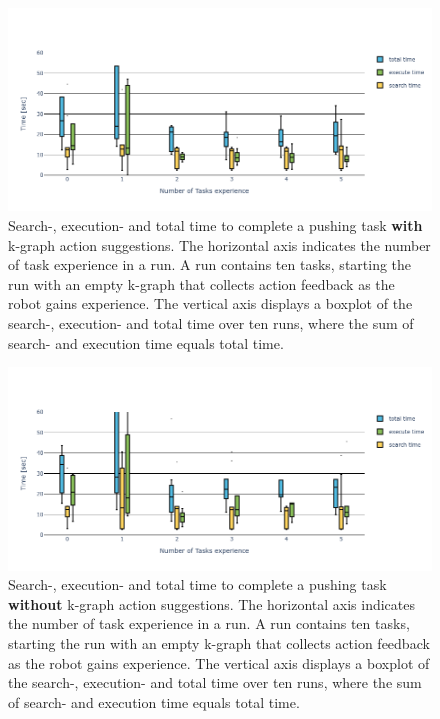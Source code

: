 \begin{figure}[H]
    \centering
    \includegraphics[width=\textwidth]{figures/results/random_push_time_k-graph}
    \caption{Search-, execution- and total time to complete a pushing task \textbf{with} \ac{k-graph} action suggestions. The horizontal axis indicates the number of task experience in a run. A run contains ten tasks, starting the run with an empty \ac{k-graph} that collects action feedback as the robot gains experience. The vertical axis displays a boxplot of the search-, execution- and total time over ten runs, where the sum of search- and execution time equals total time.}%
    \label{fig:random_push_time_k-graph}
\end{figure}

\begin{figure}[H]
    \centering
    \includegraphics[width=\textwidth]{figures/results/random_push_time_no_k-graph}
    \caption{Search-, execution- and total time to complete a pushing task \textbf{without} \ac{k-graph} action suggestions. The horizontal axis indicates the number of task experience in a run. A run contains ten tasks, starting the run with an empty \ac{k-graph} that collects action feedback as the robot gains experience. The vertical axis displays a boxplot of the search-, execution- and total time over ten runs, where the sum of search- and execution time equals total time.}%
    \label{fig:random_push_time_no_k-graph}
\end{figure}

